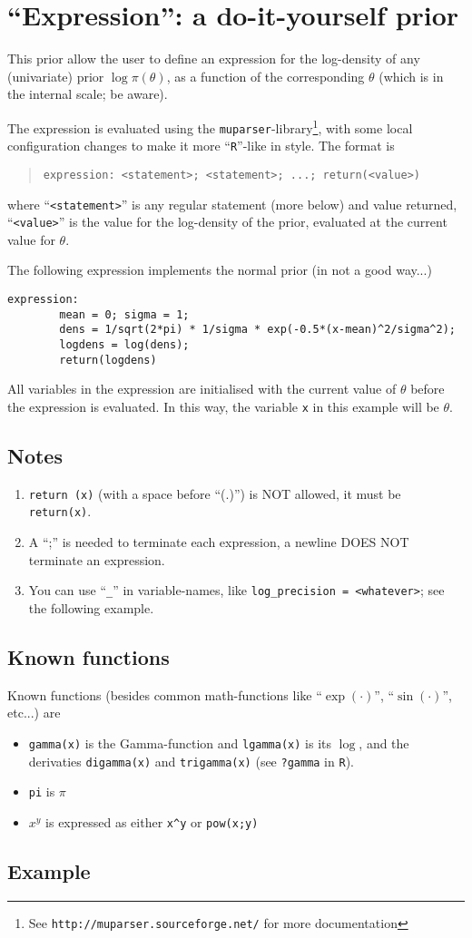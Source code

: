 \documentclass[a4paper,11pt]{article}
\begin{document}
\section*{``Expression'': a do-it-yourself prior}

This prior allow the user to define an expression for the log-density
of any (univariate) prior $\log\pi(\theta)$, as a function of the
corresponding $\theta$ (which is in the internal scale; be aware).

The expression is evaluated using the
\texttt{muparser}-library\footnote{See
    \texttt{http://muparser.sourceforge.net/} for more documentation},
with some local configuration changes to make it more
``\texttt{R}''-like in style. The format is
\begin{quote}
    \texttt{expression: <statement>; <statement>; ...; return(<value>)}
\end{quote}
where ``\texttt{<statement>}'' is any regular statement (more below)
and value returned, ``\texttt{<value>}'' is the value for the
log-density of the prior, evaluated at the current value for $\theta$.

The following expression implements the normal prior (in not a good
way...)
\begin{verbatim}
expression:
        mean = 0; sigma = 1;
        dens = 1/sqrt(2*pi) * 1/sigma * exp(-0.5*(x-mean)^2/sigma^2);
        logdens = log(dens);
        return(logdens)
\end{verbatim}
All variables in the expression are initialised with the current value
of $\theta$ before the expression is evaluated. In this way, the
variable \verb|x| in this example will be $\theta$.

\subsection*{Notes}
\begin{enumerate}
\item \verb|return (x)| (with a space before ``(.)'') is NOT allowed,
    it must be \verb|return(x)|.
\item A ``;'' is needed to terminate each expression, a newline DOES
    NOT terminate an expression.
\item You can use ``\verb|_|'' in variable-names, like
    \verb|log_precision = <whatever>|; see the following example.
\end{enumerate}

\subsection*{Known functions}
Known functions (besides common math-functions like ``$\exp(\cdot)$'',
``$\sin(\cdot)$'', etc...) are
\begin{itemize}
\item \verb|gamma(x)| is the Gamma-function and \verb|lgamma(x)| is
    its $\log$, and the derivaties \verb|digamma(x)| and
    \verb|trigamma(x)| (see \verb|?gamma| in \verb|R|).
\item \verb|pi| is $\pi$
\item $x^y$ is expressed as either \verb|x^y| or \verb|pow(x;y)|
\end{itemize}

\subsection*{Example}

\end{document}
